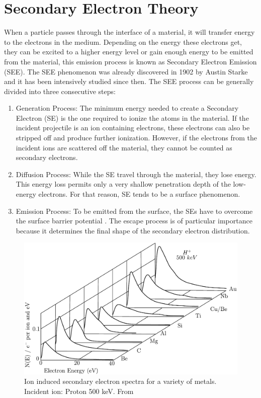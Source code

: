 \section{Secondary Electron Theory}
\label{sec:SEY}
When a particle passes through the interface of a material, it will transfer energy to the
electrons in the medium. Depending on the energy these electrons get, they can be excited
to a higher energy level or gain enough energy to be emitted from the material, this emission
process is known as Secondary Electron Emission (SEE). The SEE phenomenon was already discovered in 1902 by Austin Starke \parencite*[][]{ref:see1} and it has been intensively studied since then. The SEE process can be generally divided into three consecutive steps:

\begin{enumerate}
    \item Generation Process: The minimum energy needed to create a Secondary Electron (SE) is the one required to ionize the atoms in the material. If the incident projectile is an ion containing electrons, these electrons can also be stripped off and produce further ionization. However, if the electrons from the incident ions are scattered off the material, they cannot be counted as secondary electrons. 
    \item Diffusion Process: While the SE travel through the material, they lose energy. This energy loss permits only a very shallow penetration depth of the low-energy electrons. For that reason, SE tends to be a surface phenomenon. 
    \item Emission Process: To be emitted from the surface, the SEs have to overcome the surface barrier potential \parencite*[][]{ref:see2}. The escape process is of particular importance because it determines the final shape of the secondary electron distribution. 
\end{enumerate}

\begin{figure}[h]
    \centering
    \includegraphics[width=0.9\columnwidth]{SEE_Spectra/SeeSpectra.pdf}
    \caption{Ion induced secondary electron spectra for a variety of metals. Incident ion: Proton 500 \si[]{\kilo \electronvolt}. From \parencite*[][]{ref:SEEspectra} }
    \label{fig:MetalsSE}
\end{figure}

